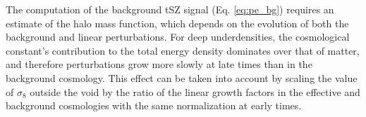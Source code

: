 \documentclass[twocolumn,amsfont,amssymb,amsmath, showpacs,balancelastpage, nofootinbib]{revtex4-1}
\begin{document}
  The computation of the background tSZ signal (Eq. \ref{eq:pe_bg}) requires an estimate
  of the halo mass function, which depends on the evolution of both the background and
  linear perturbations. For deep underdensities, the cosmological constant's contribution
  to the total energy density dominates over that of matter, and therefore perturbations
  grow more slowly at late times than in the background cosmology. This effect can be
  taken into account by scaling the value of $\sigma_8$ outside the void by the ratio of
  the linear growth factors in the effective and background cosmologies with the same
  normalization at early times.
\end{document}
